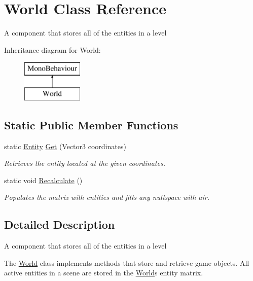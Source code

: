 \hypertarget{class_world}{}\section{World Class Reference}
\label{class_world}


A component that stores all of the entities in a level  


Inheritance diagram for World\+:\begin{figure}[H]
\begin{center}
\leavevmode
\includegraphics[height=2.000000cm]{class_world}
\end{center}
\end{figure}
\subsection*{Static Public Member Functions}
\begin{DoxyCompactItemize}
\item 
static \mbox{\hyperlink{class_entity}{Entity}} \mbox{\hyperlink{class_world_a6329d86f62ec9cf32fed26a74f68e878}{Get}} (Vector3 coordinates)
\begin{DoxyCompactList}\small\item\em Retrieves the entity located at the given coordinates. \end{DoxyCompactList}\item 
static void \mbox{\hyperlink{class_world_aafe2420b96ed8e71db9837b1517d093c}{Recalculate}} ()
\begin{DoxyCompactList}\small\item\em Populates the matrix with entities and fills any nullspace with air. \end{DoxyCompactList}\end{DoxyCompactItemize}


\subsection{Detailed Description}
A component that stores all of the entities in a level 

The \mbox{\hyperlink{class_world}{World}} class implements methods that store and retrieve game objects. All active entities in a scene are stored in the \mbox{\hyperlink{class_world}{World}}\textquotesingle{}s entity matrix. 

